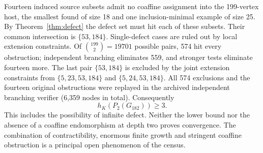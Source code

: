 \documentclass[11pt,a4paper]{article}
\theoremstyle{definition}\newtheorem{definition}[theorem]{Definition}\newtheorem{example}[theorem]{Example}
\theoremstyle{remark}\newtheorem{remark}[theorem]{Remark}
\begin{document}
Fourteen induced source subsets admit no coaffine assignment into the 199-vertex host, the smallest found of size 18 and one inclusion-minimal example of size 25. By Theorem~\ref{thm:defect} the defect set must hit each of these subsets. Their common intersection is \(\{53,184\}\). Single-defect cases are ruled out by local extension constraints. Of \(\binom{199}{2}=19701\) possible pairs, 574 hit every obstruction; independent branching eliminates 559, and stronger tests eliminate fourteen more. The last pair \(\{53,184\}\) is excluded by the joint extension constraints from \(\{5,23,53,184\}\) and \(\{5,24,53,184\}\). All 574 exclusions and the fourteen original obstructions were replayed in the archived independent branching verifier (6,359 nodes in total). Consequently
\[
 h_K(P_2(G_{182}))\ge3.
\]
This includes the possibility of infinite defect. Neither the lower bound nor the absence of a coaffine endomorphism at depth two proves convergence. The combination of contractibility, enormous finite growth and stringent coaffine obstruction is a principal open phenomenon of the census.
\end{document}
